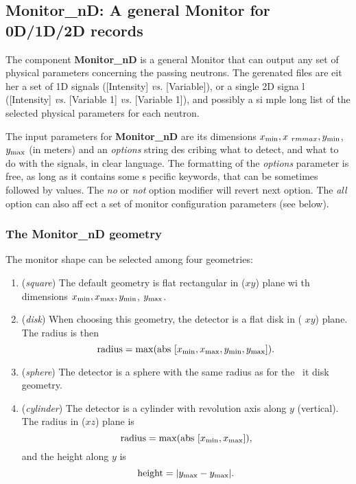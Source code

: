 \documentclass[12pt]{report}
\begin{document}


\subsection{Monitor\_nD: A general Monitor for 0D/1D/2D records}
\label{s:monitornd}

The component {\bf Monitor\_nD} is a general Monitor that can output any set of 
physical parameters concerning the passing neutrons. The gerenated files are eit
her a set of 1D signals ([Intensity] {\it vs.} [Variable]), or a single 2D signa
l ([Intensity] {\it vs.} [Variable 1] {\it vs.} [Variable 1]), and possibly a si
mple long list of the selected physical parameters for each neutron.

The input parameters for {\bf Monitor\_nD} are its dimensions $x_{\rm min}, x_{\
rm max}, y_{\rm min}$, $y_{\rm max}$ (in meters) and an {\it options} string des
cribing what to detect, and what to do with the signals, in clear language. The 
formatting of the {\it options} parameter is free, as long as it contains some s
pecific keywords, that can be sometimes followed by values. The {\it no} or {\it
 not} option modifier will revert next option. The {\it all} option can also aff
ect a set of monitor configuration parameters (see below). 

\subsubsection{The Monitor\_nD geometry}

The monitor shape can be selected among four geometries:
\begin{enumerate}
\item{({\it square}) The default geometry is flat rectangular in ($xy$) plane wi
th dimensions $x_{\rm min}, x_{\rm max}, y_{\rm min}$, $y_{\rm max}$.}
\item{({\it disk}) When choosing this geometry, the detector is a flat disk in (
$xy$) plane. The radius is then
\begin{equation}
\mbox{radius} =  \max ( \mbox{abs } [ x_{\rm min}, x_{\rm max}, y_{\rm min}, y_{
\rm max} ] ).
\end{equation}
}
\item{({\it sphere}) The detector is a sphere with the same radius as for the {\
it disk} geometry.}
\item{({\it cylinder}) The detector is a cylinder with revolution axis along $y$
 (vertical). The radius in ($xz$) plane is
\begin{equation}
\mbox{radius} =  \max ( \mbox{abs } [ x_{\rm min}, x_{\rm max} ] ),
\end{equation}
and the height along $y$ is 
\begin{equation}
\mbox{height} =  | y_{\rm max} - y_{\rm max} |.
\end{equation}
}
\end{enumerate}
\end{document}
